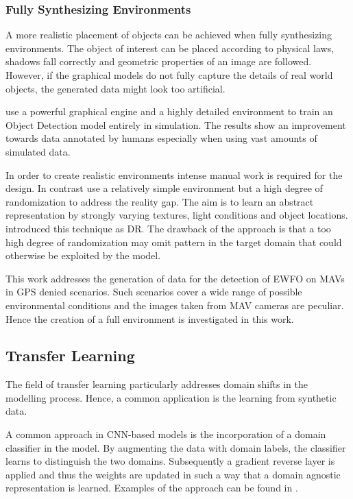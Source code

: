 \subsubsection{Fully Synthesizing Environments}

A more realistic placement of objects can be achieved when fully synthesizing environments.  The object of interest can be placed according to physical laws, shadows fall correctly and geometric properties of an image are followed. However, if the graphical models do not fully capture the details of real world objects, the generated data might look too artificial.

\citeauthor{Johnson-Roberson2016} \cite{Johnson-Roberson2016} use a powerful graphical engine and a highly detailed environment to train an Object Detection model entirely in simulation. The results show an improvement towards data annotated by humans especially when using vast amounts of simulated data. 

In order to create realistic environments intense manual work is required for the design. In contrast \cite{Sadeghi2016, Tobin2017, Tremblay2018a} use a relatively simple environment but a high degree of randomization to address the reality gap. The aim is to learn an abstract representation by strongly varying textures, light conditions and object locations. \citeauthor{Tobin2017} introduced this technique as \ac{DR}. The drawback of the approach is that a too high degree of randomization may omit pattern in the target domain that could otherwise be exploited by the model. 

This work addresses the generation of data for the detection of \ac{EWFO} on \acp{MAV} in \ac{GPS} denied scenarios. Such scenarios cover a wide range of possible environmental conditions and the images taken from \ac{MAV} cameras are peculiar. Hence the creation of a full environment is investigated in this work. 


\subsection{Transfer Learning}

The field of transfer learning particularly addresses domain shifts in the modelling process. Hence, a common application is the learning from synthetic data.

A common approach in \ac{CNN}-based models is the incorporation of a domain classifier in the model. By augmenting the data with domain labels, the classifier learns to distinguish the two domains. Subsequently a gradient reverse layer is applied and thus the weights are updated in such a way that a domain agnostic representation is learned. Examples of the approach can be found in \cite{Chen2018c, Xu2017}.

